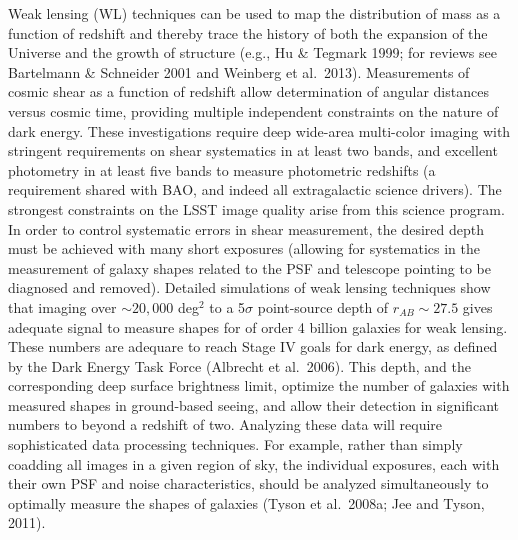 \documentclass{emulateapj}
\newcommand{\B}[1]{{#1}}
\newcommand{\R}[1]{{\color{red}}}
\begin{document}
Weak lensing (WL) techniques can be used to map the distribution of
mass as a function of redshift and thereby trace the history of both
the expansion of the Universe and the growth of structure (e.g., Hu \&
Tegmark 1999; for reviews see Bartelmann \& Schneider 2001 and
Weinberg et al.~2013).  Measurements of cosmic shear as a function of
redshift allow determination of angular distances versus cosmic time,
providing multiple independent constraints on the nature of dark
energy.  These investigations require deep wide-area multi-color
imaging with stringent requirements on shear systematics in at least
two bands, and excellent photometry in at least five bands to measure
photometric redshifts (a requirement shared with BAO, and indeed all
extragalactic science drivers). The strongest constraints on the LSST
image quality arise from this science program. In order to control
systematic errors in shear measurement, the desired depth must be
achieved with many short exposures (allowing for systematics in the
measurement of galaxy shapes related
to the PSF and telescope pointing to be diagnosed and removed). Detailed simulations of
weak lensing techniques show that imaging over $\sim20,000$ deg$^2$ to
a 5$\sigma$ point-source depth of $r_{AB} \sim 27.5$ gives adequate
signal to measure shapes for of order 4 billion galaxies for weak
lensing.  These numbers are adequare to reach
Stage IV goals for dark energy, as defined by the Dark Energy Task
Force (Albrecht et al.~2006).   
This
depth, \B{and the corresponding deep surface brightness limit,}
optimize the number of galaxies with measured shapes in ground-based
seeing, and allow their detection in significant numbers to beyond a
redshift of two.  \R{It is anticipated that} Analyzing these data will
require sophisticated data processing techniques.  For example, rather
than simply coadding all images in a given region of sky, the
individual exposures, each with their own PSF and noise
characteristics,  should be analyzed simultaneously to optimally
measure the shapes of galaxies (Tyson et al.~2008a;
Jee and Tyson, 2011).
\end{document}
